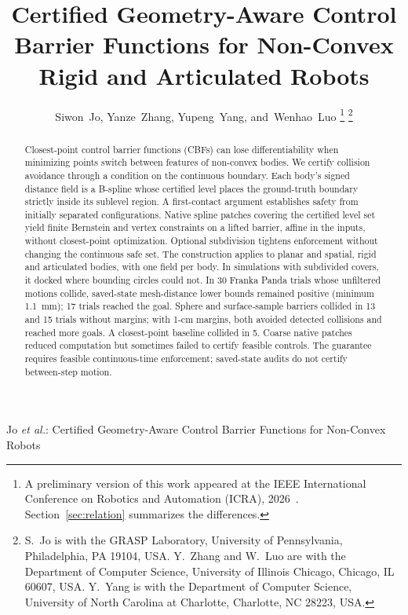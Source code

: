\documentclass[journal]{IEEEtran}
\theoremstyle{definition}
\newif\ifanonymous
\begin{document}
\title{Certified Geometry-Aware Control Barrier Functions for Non-Convex Rigid and Articulated
Robots}

\ifanonymous
\author{Anonymous Authors}
\markboth{IEEE Transactions on Robotics}%
{Certified Geometry-Aware Control Barrier Functions for Non-Convex Robots}
\else
\author{Siwon~Jo, Yanze~Zhang, Yupeng~Yang, and~Wenhao~Luo%
\thanks{A preliminary version of this work appeared at the IEEE International Conference on
Robotics and Automation (ICRA), 2026~\cite{jo2026geometry}. Section~\ref{sec:relation}
summarizes the differences.}%
\thanks{S.~Jo is with the GRASP Laboratory, University of Pennsylvania, Philadelphia, PA 19104,
USA. Y.~Zhang and W.~Luo are with the Department of Computer Science, University of Illinois
Chicago, Chicago, IL 60607, USA. Y.~Yang is with the Department of Computer Science, University
of North Carolina at Charlotte, Charlotte, NC 28223, USA.}}

%
{Jo \MakeLowercase{\textit{et al.}}: Certified Geometry-Aware Control Barrier Functions for Non-Convex Robots}
\fi

\maketitle

\begin{abstract}
Closest-point control barrier functions (CBFs) can lose differentiability when minimizing points
switch between features of non-convex bodies. We certify collision avoidance through a condition
on the continuous boundary. Each body's signed distance field is a B-spline
whose certified level places the ground-truth boundary strictly inside its sublevel region.
A first-contact argument establishes safety from initially separated configurations. Native
spline patches covering the certified level set yield finite Bernstein and vertex constraints
on a lifted barrier, affine in the inputs, without closest-point optimization. Optional subdivision
tightens enforcement without changing the continuous safe set. The construction applies to planar
and spatial, rigid and articulated bodies, with one field per body. In simulations with subdivided
covers, it docked where bounding circles could not. In 30 Franka Panda trials whose unfiltered
motions collide, saved-state mesh-distance lower bounds remained positive (minimum
1.1~mm); 17 trials reached the goal. Sphere and surface-sample barriers collided in 13 and 15 trials
without margins; with
1-cm margins, both avoided detected collisions and reached more goals. A closest-point baseline
collided in 5. Coarse native patches reduced computation but sometimes
failed to certify feasible controls. The guarantee requires feasible continuous-time enforcement;
saved-state audits do not certify between-step motion.
\end{abstract}
\end{document}
